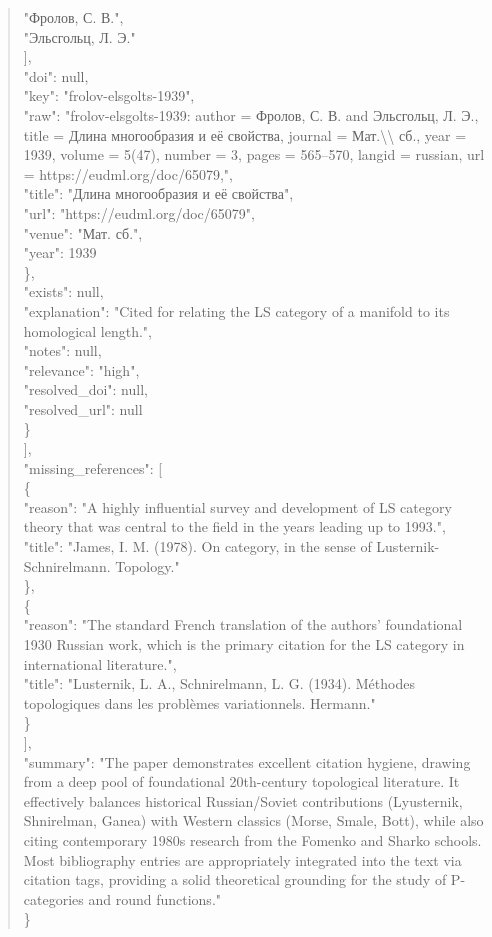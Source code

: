 \documentclass[11pt]{article}
\begin{document}
\begin{quote}
          "Фролов, С. В.",\\
          "Эльсгольц, Л. Э."\\
        ],\\
        "doi": null,\\
        "key": "frolov-elsgolts-1939",\\
        "raw": "frolov-elsgolts-1939: author = Фролов, С. В. and Эльсгольц, Л. Э., title = Длина многообразия и её свойства, journal = Мат.\textbackslash{}\textbackslash{} сб., year = 1939, volume = 5(47), number = 3, pages = 565--570, langid = russian, url = https://eudml.org/doc/65079,",\\
        "title": "Длина многообразия и её свойства",\\
        "url": "https://eudml.org/doc/65079",\\
        "venue": "Мат. сб.",\\
        "year": 1939\\
      \},\\
      "exists": null,\\
      "explanation": "Cited for relating the LS category of a manifold to its homological length.",\\
      "notes": null,\\
      "relevance": "high",\\
      "resolved\_doi": null,\\
      "resolved\_url": null\\
    \}\\
  ],\\
  "missing\_references": [\\
    \{\\
      "reason": "A highly influential survey and development of LS category theory that was central to the field in the years leading up to 1993.",\\
      "title": "James, I. M. (1978). On category, in the sense of Lusternik-Schnirelmann. Topology."\\
    \},\\
    \{\\
      "reason": "The standard French translation of the authors' foundational 1930 Russian work, which is the primary citation for the LS category in international literature.",\\
      "title": "Lusternik, L. A., Schnirelmann, L. G. (1934). Méthodes topologiques dans les problèmes variationnels. Hermann."\\
    \}\\
  ],\\
  "summary": "The paper demonstrates excellent citation hygiene, drawing from a deep pool of foundational 20th-century topological literature. It effectively balances historical Russian/Soviet contributions (Lyusternik, Shnirelman, Ganea) with Western classics (Morse, Smale, Bott), while also citing contemporary 1980s research from the Fomenko and Sharko schools. Most bibliography entries are appropriately integrated into the text via citation tags, providing a solid theoretical grounding for the study of P-categories and round functions."\\
\}\\
\end{quote}
\end{document}
